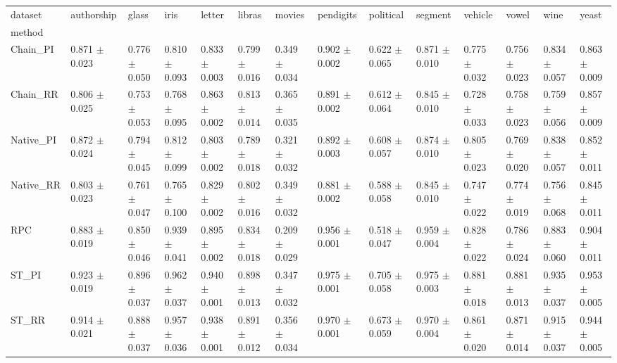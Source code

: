 \begin{tabular}{llllllllllllll}
\toprule
dataset &           authorship &                glass &                 iris &               letter &               libras &               movies &            pendigits &            political &              segment &              vehicle &                vowel &                 wine &                yeast \\
method    &                      &                      &                      &                      &                      &                      &                      &                      &                      &                      &                      &                      &                      \\
\midrule
Chain_PI  &  0.871 $ \pm $ 0.023 &  0.776 $ \pm $ 0.050 &  0.810 $ \pm $ 0.093 &  0.833 $ \pm $ 0.003 &  0.799 $ \pm $ 0.016 &  0.349 $ \pm $ 0.034 &  0.902 $ \pm $ 0.002 &  0.622 $ \pm $ 0.065 &  0.871 $ \pm $ 0.010 &  0.775 $ \pm $ 0.032 &  0.756 $ \pm $ 0.023 &  0.834 $ \pm $ 0.057 &  0.863 $ \pm $ 0.009 \\
Chain_RR  &  0.806 $ \pm $ 0.025 &  0.753 $ \pm $ 0.053 &  0.768 $ \pm $ 0.095 &  0.863 $ \pm $ 0.002 &  0.813 $ \pm $ 0.014 &  0.365 $ \pm $ 0.035 &  0.891 $ \pm $ 0.002 &  0.612 $ \pm $ 0.064 &  0.845 $ \pm $ 0.010 &  0.728 $ \pm $ 0.033 &  0.758 $ \pm $ 0.023 &  0.759 $ \pm $ 0.056 &  0.857 $ \pm $ 0.009 \\
Native_PI &  0.872 $ \pm $ 0.024 &  0.794 $ \pm $ 0.045 &  0.812 $ \pm $ 0.099 &  0.803 $ \pm $ 0.002 &  0.789 $ \pm $ 0.018 &  0.321 $ \pm $ 0.032 &  0.892 $ \pm $ 0.003 &  0.608 $ \pm $ 0.057 &  0.874 $ \pm $ 0.010 &  0.805 $ \pm $ 0.023 &  0.769 $ \pm $ 0.020 &  0.838 $ \pm $ 0.057 &  0.852 $ \pm $ 0.011 \\
Native_RR &  0.803 $ \pm $ 0.023 &  0.761 $ \pm $ 0.047 &  0.765 $ \pm $ 0.100 &  0.829 $ \pm $ 0.002 &  0.802 $ \pm $ 0.016 &  0.349 $ \pm $ 0.032 &  0.881 $ \pm $ 0.002 &  0.588 $ \pm $ 0.058 &  0.845 $ \pm $ 0.010 &  0.747 $ \pm $ 0.022 &  0.774 $ \pm $ 0.019 &  0.756 $ \pm $ 0.068 &  0.845 $ \pm $ 0.011 \\
RPC       &  0.883 $ \pm $ 0.019 &  0.850 $ \pm $ 0.046 &  0.939 $ \pm $ 0.041 &  0.895 $ \pm $ 0.002 &  0.834 $ \pm $ 0.018 &  0.209 $ \pm $ 0.029 &  0.956 $ \pm $ 0.001 &  0.518 $ \pm $ 0.047 &  0.959 $ \pm $ 0.004 &  0.828 $ \pm $ 0.022 &  0.786 $ \pm $ 0.024 &  0.883 $ \pm $ 0.060 &  0.904 $ \pm $ 0.011 \\
ST_PI     &  0.923 $ \pm $ 0.019 &  0.896 $ \pm $ 0.037 &  0.962 $ \pm $ 0.037 &  0.940 $ \pm $ 0.001 &  0.898 $ \pm $ 0.013 &  0.347 $ \pm $ 0.032 &  0.975 $ \pm $ 0.001 &  0.705 $ \pm $ 0.058 &  0.975 $ \pm $ 0.003 &  0.881 $ \pm $ 0.018 &  0.881 $ \pm $ 0.013 &  0.935 $ \pm $ 0.037 &  0.953 $ \pm $ 0.005 \\
ST_RR     &  0.914 $ \pm $ 0.021 &  0.888 $ \pm $ 0.037 &  0.957 $ \pm $ 0.036 &  0.938 $ \pm $ 0.001 &  0.891 $ \pm $ 0.012 &  0.356 $ \pm $ 0.034 &  0.970 $ \pm $ 0.001 &  0.673 $ \pm $ 0.059 &  0.970 $ \pm $ 0.004 &  0.861 $ \pm $ 0.020 &  0.871 $ \pm $ 0.014 &  0.915 $ \pm $ 0.037 &  0.944 $ \pm $ 0.005 \\
\bottomrule
\end{tabular}
